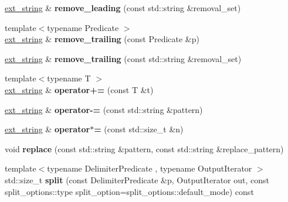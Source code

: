 \begin{DoxyCompactItemize}
\item 
\hypertarget{classstrtk_1_1ext__string_aa1008ba0bc73714350da5440eecb37c2}{\hyperlink{classstrtk_1_1ext__string}{ext\-\_\-string} \& {\bfseries remove\-\_\-leading} (const std\-::string \&removal\-\_\-set)}\label{classstrtk_1_1ext__string_aa1008ba0bc73714350da5440eecb37c2}

\item 
\hypertarget{classstrtk_1_1ext__string_a079cda4fdd3d5904538346978c63222a}{{\footnotesize template$<$typename Predicate $>$ }\\\hyperlink{classstrtk_1_1ext__string}{ext\-\_\-string} \& {\bfseries remove\-\_\-trailing} (const Predicate \&p)}\label{classstrtk_1_1ext__string_a079cda4fdd3d5904538346978c63222a}

\item 
\hypertarget{classstrtk_1_1ext__string_aa6d7f67d5ccd9abd724a5972c34f0581}{\hyperlink{classstrtk_1_1ext__string}{ext\-\_\-string} \& {\bfseries remove\-\_\-trailing} (const std\-::string \&removal\-\_\-set)}\label{classstrtk_1_1ext__string_aa6d7f67d5ccd9abd724a5972c34f0581}

\item 
\hypertarget{classstrtk_1_1ext__string_ab2aed17b629f9ce5a6be6f2885a48de9}{{\footnotesize template$<$typename T $>$ }\\\hyperlink{classstrtk_1_1ext__string}{ext\-\_\-string} \& {\bfseries operator+=} (const T \&t)}\label{classstrtk_1_1ext__string_ab2aed17b629f9ce5a6be6f2885a48de9}

\item 
\hypertarget{classstrtk_1_1ext__string_a9d98afbdfc3947ee99dbb80835bb4600}{\hyperlink{classstrtk_1_1ext__string}{ext\-\_\-string} \& {\bfseries operator-\/=} (const std\-::string \&pattern)}\label{classstrtk_1_1ext__string_a9d98afbdfc3947ee99dbb80835bb4600}

\item 
\hypertarget{classstrtk_1_1ext__string_a87739d8e2f948c47d01ea073984b0e00}{\hyperlink{classstrtk_1_1ext__string}{ext\-\_\-string} \& {\bfseries operator$\ast$=} (const std\-::size\-\_\-t \&n)}\label{classstrtk_1_1ext__string_a87739d8e2f948c47d01ea073984b0e00}

\item 
\hypertarget{classstrtk_1_1ext__string_a744598abb8c6def7ad303fe7e8edc508}{void {\bfseries replace} (const std\-::string \&pattern, const std\-::string \&replace\-\_\-pattern)}\label{classstrtk_1_1ext__string_a744598abb8c6def7ad303fe7e8edc508}

\item 
\hypertarget{classstrtk_1_1ext__string_afd2ad93313e0c3f2845c4679b688ff7c}{{\footnotesize template$<$typename Delimiter\-Predicate , typename Output\-Iterator $>$ }\\std\-::size\-\_\-t {\bfseries split} (const Delimiter\-Predicate \&p, Output\-Iterator out, const split\-\_\-options\-::type split\-\_\-option=split\-\_\-options\-::default\-\_\-mode) const }\label{classstrtk_1_1ext__string_afd2ad93313e0c3f2845c4679b688ff7c}


\end{DoxyCompactItemize}
